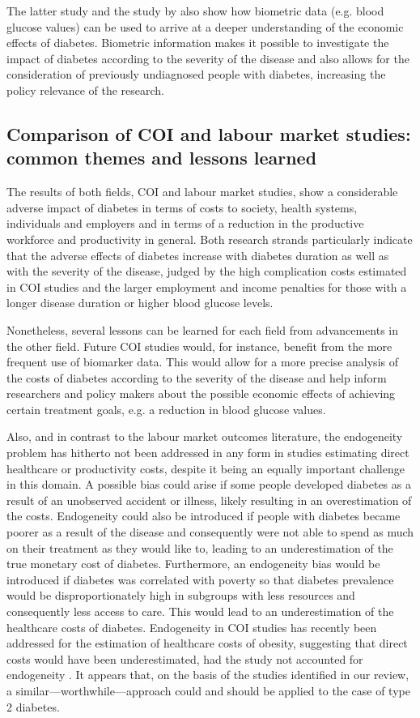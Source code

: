 The latter study and the study by \textcite{Liu2014} also show how biometric data (e.g. blood glucose values) can be used to arrive at a deeper understanding of the economic effects of diabetes. Biometric information makes it possible to investigate the impact of diabetes according to the severity of the disease and also allows for the consideration of previously undiagnosed people with diabetes, increasing the policy relevance of the research.

\subsection{Comparison of COI and labour market studies: common themes and lessons learned}
The results of both fields, \ac{COI} and labour market studies, show a considerable adverse impact of diabetes in terms of costs to society, health systems, individuals and employers and in terms of a reduction in the productive workforce and productivity in general. Both research strands particularly indicate that the adverse effects of diabetes increase with diabetes duration as well as with the severity of the disease, judged by the high complication costs estimated in \ac{COI} studies and the larger employment and income penalties for those with a longer disease duration or higher blood glucose levels. 

Nonetheless, several lessons can be learned for each field from advancements in the other field. Future \ac{COI} studies would, for instance, benefit from the more frequent use of biomarker data. This would allow for a more precise analysis of the costs of diabetes according to the severity of the disease and help inform researchers and policy makers about the possible economic effects of achieving certain treatment goals, e.g. \DIFdelbegin \DIFdel{, }\DIFdelend a reduction in blood glucose values.

Also, and in contrast to the labour market outcomes literature, the endogeneity problem has hitherto not been addressed in any form in studies estimating direct healthcare or productivity costs, despite it being an equally important challenge in this domain. A possible bias could arise if some people developed diabetes as a result of an unobserved accident or illness, likely resulting in an overestimation of the costs. Endogeneity could also be introduced if people with diabetes became poorer as a result of the disease and consequently were not able to spend as much on their treatment as they would like to, leading to an underestimation of the true monetary cost of diabetes. Furthermore, an endogeneity bias would be introduced if diabetes was correlated with poverty so that diabetes prevalence would be disproportionately high in subgroups with less resources and consequently less access to care. This would lead to an underestimation of the healthcare costs of diabetes. Endogeneity in \ac{COI} studies has recently been addressed for the estimation of healthcare costs of obesity, suggesting that direct costs would have been underestimated, had the study not accounted for endogeneity \parencite{Cawley2012b}. It appears that, on the basis of the studies identified in our review, a similar---worthwhile---approach could and should be applied to the case of type 2 diabetes.

